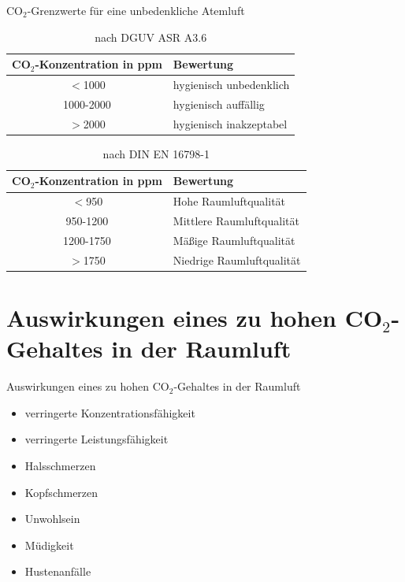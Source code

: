 \documentclass[10pt,ngerman]{beamer}
\begin{document}
\begin{frame}[fragile]{CO$_2$-Grenzwerte für eine unbedenkliche Atemluft}
  \begin{table}
    \begin{tabular}{ |c|p{}|}
      \hline
      CO$_2$-Konzentration in ppm & Bewertung               \\ \hline
      $<$1000                     & hygienisch unbedenklich \\ \hline
      1000-2000                   & hygienisch auffällig    \\ \hline
      $>$2000                     & hygienisch inakzeptabel \\ \hline
    \end{tabular}
    \caption{nach DGUV ASR A3.6}
  \end{table}
  \begin{table}
    \begin{tabular}{|c|p{}|}
      \hline
      CO$_2$-Konzentration in ppm & Bewertung                 \\ \hline
      $<$950                      & Hohe Raumluftqualität     \\ \hline
      950-1200                    & Mittlere Raumluftqualität \\ \hline
      1200-1750                   & Mäßige Raumluftqualität   \\ \hline
      $>$1750                     & Niedrige Raumluftqualität \\ \hline
    \end{tabular}
    \caption{nach DIN EN 16798-1}
  \end{table}
\end{frame}

\section{Auswirkungen eines zu hohen CO$_2$-Gehaltes in der Raumluft}
\begin{frame}[fragile]{Auswirkungen eines zu hohen CO$_2$-Gehaltes in der Raumluft}
  \begin{itemize}
    \item verringerte Konzentrationsfähigkeit
    \item verringerte Leistungsfähigkeit
    \item Halsschmerzen
    \item Kopfschmerzen
    \item Unwohlsein
    \item Müdigkeit
    \item Hustenanfälle
  \end{itemize}
\end{frame}
\end{document}
